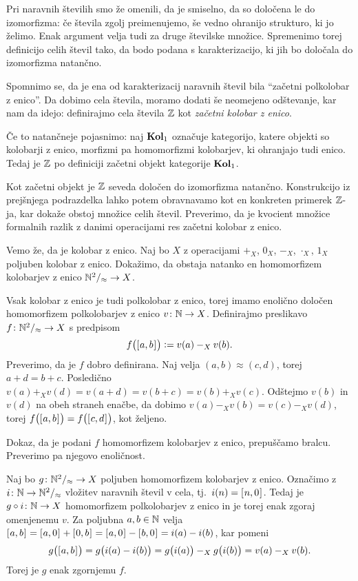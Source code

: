 Pri naravnih številih smo že omenili, da je smiselno, da so določena le do izomorfizma: če števila zgolj preimenujemo, še vedno ohranijo strukturo, ki jo želimo. Enak argument velja tudi za druge številske množice. Spremenimo torej definicijo celih števil tako, da bodo podana s karakterizacijo, ki jih bo določala do izomorfizma natančno.

Spomnimo se, da je ena od karakterizacij naravnih števil bila ``začetni polkolobar z enico''. Da dobimo cela števila, moramo dodati še neomejeno odštevanje, kar nam da idejo: definirajmo cela števila $\mathbb{Z}$ kot \emph{začetni kolobar z enico}.

Če to natančneje pojasnimo: naj $\mathbf{Kol}_1$ označuje kategorijo, katere objekti so kolobarji z enico, morfizmi pa homomorfizmi kolobarjev, ki ohranjajo tudi enico. Tedaj je $\mathbb{Z}$ po definiciji začetni objekt kategorije $\mathbf{Kol}_1$.

Kot začetni objekt je $\mathbb{Z}$ seveda določen do izomorfizma natančno. Konstrukcijo iz prejšnjega podrazdelka lahko potem obravnavamo kot en konkreten primerek $\mathbb{Z}$-ja, kar dokaže obstoj množice celih števil. Preverimo, da je kvocient množice formalnih razlik z danimi operacijami res začetni kolobar z enico.

Vemo že, da je kolobar z enico. Naj bo $X$ z operacijami $+_X$, $0_X$, $-_X$, $\cdot_X$, $1_X$ poljuben kolobar z enico. Dokažimo, da obstaja natanko en homomorfizem kolobarjev z enico $\mathbb{N}^2/_\approx \to X$.

Vsak kolobar z enico je tudi polkolobar z enico, torej imamo enolično določen homomorfizem polkolobarjev z enico $v\colon \mathbb{N} \to X$. Definirajmo preslikavo $f\colon \mathbb{N}^2/_\approx \to X$ s predpisom
\[f\big([\:\!{a, b}\:\!]_{}\big) \mathrel{\mathop:}= v(a) -_X v(b).\]
Preverimo, da je $f$ dobro definirana. Naj velja $(a, b) \approx (c, d)$, torej $a + d = b + c$. Posledično $v(a) +_X v(d) = v(a + d) = v(b + c) = v(b) +_X v(c)$. Odštejmo $v(b)$ in $v(d)$ na obeh straneh enačbe, da dobimo $v(a) -_X v(b) = v(c) -_X v(d)$, torej $f\big([\:\!{a, b}\:\!]_{}\big) = f\big([\:\!{c, d}\:\!]_{}\big)$, kot željeno.

Dokaz, da je podani $f$ homomorfizem kolobarjev z enico, prepuščamo bralcu. Preverimo pa njegovo enoličnost.

Naj bo $g\colon \mathbb{N}^2/_\approx \to X$ poljuben homomorfizem kolobarjev z enico. Označimo z $i\colon \mathbb{N} \to \mathbb{N}^2/_\approx$ vložitev naravnih števil v cela, tj.~$i(n) = [\:\!{n, 0}\:\!]_{}$. Tedaj je $g \circ i\colon \mathbb{N} \to X$ homomorfizem polkolobarjev z enico in je torej enak zgoraj omenjenemu $v$. Za poljubna $a, b \in \mathbb{N}$ velja $\ec{a, b} = \ec{a, 0} + \ec{0, b} = \ec{a, 0} - \ec{b, 0} = i(a) - i(b)$, kar pomeni
\[g\big([\:\!{a, b}\:\!]_{}\big) = g\big(i(a) - i(b)\big) = g\big(i(a)\big) -_X g\big(i(b)\big) = v(a) -_X v(b).\]
Torej je $g$ enak zgornjemu $f$.

